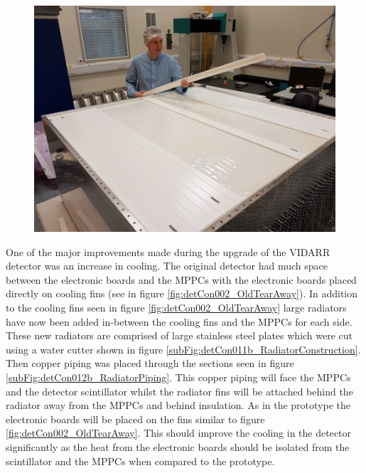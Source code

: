\begin{figure}[htbp]
\centering
\includegraphics[width=0.8\linewidth]{Chapter3/Figs/Raster/detCon006_RonInCleanRoom.png}
\label{fig:detCon006_RonInCleanRoom}
\end{figure}

One of the major improvements made during the upgrade of the VIDARR detector was an increase in cooling. The original detector had much space between the electronic boards and the MPPCs with the electronic boards placed directly on cooling fins (see in figure \ref{fig:detCon002_OldTearAway}). In addition to the cooling fins seen in figure \ref{fig:detCon002_OldTearAway} large radiators have now been added in-between the cooling fins and the MPPCs for each side. These new radiators are comprised of large stainless steel plates which were cut using a water cutter shown in figure \ref{subFig:detCon011b_RadiatorConstruction}. Then copper piping was placed through the sections seen in figure \ref{subFig:detCon012b_RadiatorPiping}. This copper piping will face the MPPCs and the detector scintillator whilst the radiator fins will be attached behind the radiator away from the MPPCs and behind insulation. As in the prototype the electronic boards will be placed on the fins similar to figure \ref{fig:detCon002_OldTearAway}. This should improve the cooling in the detector significantly as the heat from the electronic boards should be isolated from the scintillator and the MPPCs when compared to the prototype. 


